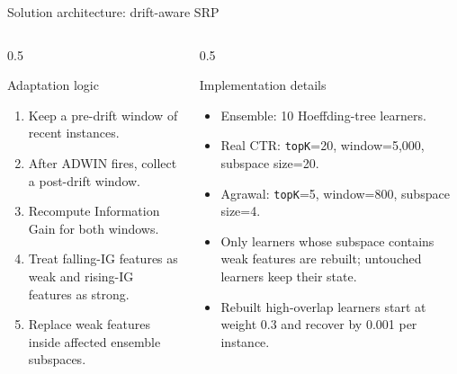 \documentclass[aspectratio=169,xcolor=dvipsnames]{beamer}
\begin{document}
\begin{frame}{Solution architecture: drift-aware SRP}
\begin{columns}[T]
    \begin{column}{0.5\textwidth}
        \begin{block}{Adaptation logic}
        \small
        \begin{enumerate}
            \item Keep a pre-drift window of recent instances.
            \item After ADWIN fires, collect a post-drift window.
            \item Recompute Information Gain for both windows.
            \item Treat falling-IG features as weak and rising-IG features as strong.
            \item Replace weak features inside affected ensemble subspaces.
        \end{enumerate}
        \end{block}
    \end{column}
    \begin{column}{0.5\textwidth}
        \begin{block}{Implementation details}
        \small
        \begin{itemize}
            \item Ensemble: 10 Hoeffding-tree learners.
            \item Real CTR: \texttt{topK}=20, window=5,000, subspace size=20.
            \item Agrawal: \texttt{topK}=5, window=800, subspace size=4.
            \item Only learners whose subspace contains weak features are rebuilt; untouched learners keep their state.
            \item Rebuilt high-overlap learners start at weight 0.3 and recover by 0.001 per instance.
        \end{itemize}
        \end{block}
    \end{column}
\end{columns}
\end{frame}

\end{document}
